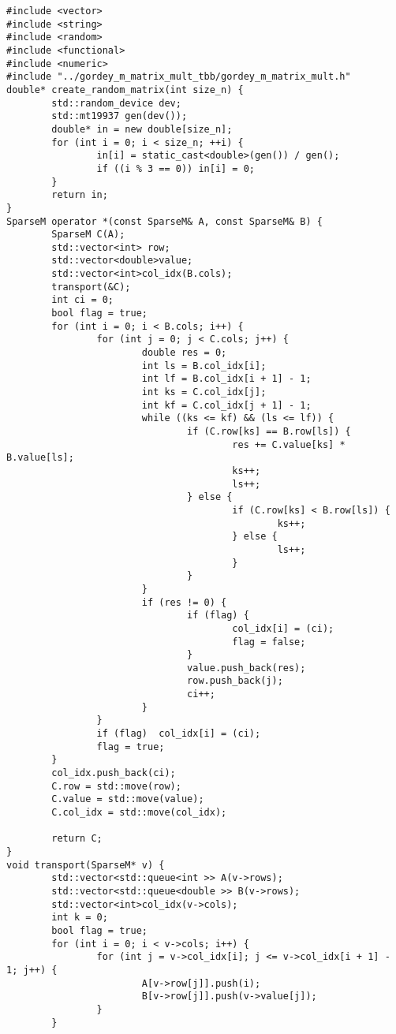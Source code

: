 \documentclass{report}
\begin{document}
\begin{lstlisting}
#include <vector>
#include <string>
#include <random>
#include <functional>
#include <numeric>
#include "../gordey_m_matrix_mult_tbb/gordey_m_matrix_mult.h"
double* create_random_matrix(int size_n) {
        std::random_device dev;
        std::mt19937 gen(dev());
        double* in = new double[size_n];
        for (int i = 0; i < size_n; ++i) {
                in[i] = static_cast<double>(gen()) / gen();
                if ((i % 3 == 0)) in[i] = 0;
        }
        return in;
}
SparseM operator *(const SparseM& A, const SparseM& B) {
        SparseM C(A);
        std::vector<int> row;
        std::vector<double>value;
        std::vector<int>col_idx(B.cols);
        transport(&C);
        int ci = 0;
        bool flag = true;
        for (int i = 0; i < B.cols; i++) {
                for (int j = 0; j < C.cols; j++) {
                        double res = 0;
                        int ls = B.col_idx[i];
                        int lf = B.col_idx[i + 1] - 1;
                        int ks = C.col_idx[j];
                        int kf = C.col_idx[j + 1] - 1;
                        while ((ks <= kf) && (ls <= lf)) {
                                if (C.row[ks] == B.row[ls]) {
                                        res += C.value[ks] * B.value[ls];
                                        ks++;
                                        ls++;
                                } else {
                                        if (C.row[ks] < B.row[ls]) {
                                                ks++;
                                        } else {
                                                ls++;
                                        }
                                }
                        }
                        if (res != 0) {
                                if (flag) {
                                        col_idx[i] = (ci);
                                        flag = false;
                                }
                                value.push_back(res);
                                row.push_back(j);
                                ci++;
                        }
                }
                if (flag)  col_idx[i] = (ci);
                flag = true;
        }
        col_idx.push_back(ci);
        C.row = std::move(row);
        C.value = std::move(value);
        C.col_idx = std::move(col_idx);

        return C;
}
void transport(SparseM* v) {
        std::vector<std::queue<int >> A(v->rows);
        std::vector<std::queue<double >> B(v->rows);
        std::vector<int>col_idx(v->cols);
        int k = 0;
        bool flag = true;
        for (int i = 0; i < v->cols; i++) {
                for (int j = v->col_idx[i]; j <= v->col_idx[i + 1] - 1; j++) {
                        A[v->row[j]].push(i);
                        B[v->row[j]].push(v->value[j]);
                }
        }


\end{lstlisting}
\end{document}
